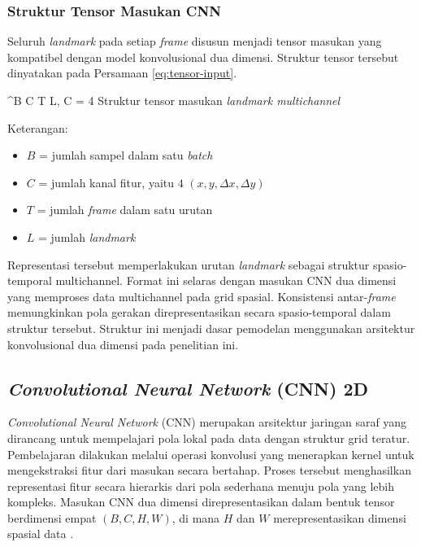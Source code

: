 \subsubsection{Struktur Tensor Masukan CNN}
\label{subsubsec:struktur-tensor}
Seluruh \textit{landmark} pada setiap \textit{frame} disusun menjadi tensor masukan yang kompatibel dengan model konvolusional dua dimensi.
Struktur tensor tersebut dinyatakan pada Persamaan \ref{eq:tensor-input}.

\begin{equationcaptioned}{
 \in {}^{B \times C \times T \times L}, \quad C = 4
}{
Struktur tensor masukan \textit{landmark multichannel}
}
\end{equationcaptioned}

Keterangan:
\begin{itemize}
  \renewcommand{\labelitemi}{}
  \item $B$ = jumlah sampel dalam satu \textit{batch}
  \item $C$ = jumlah kanal fitur, yaitu $4$ $(x, y, \Delta x, \Delta y)$
  \item $T$ = jumlah \textit{frame} dalam satu urutan
  \item $L$ = jumlah \textit{landmark}
\end{itemize}

Representasi tersebut memperlakukan urutan \textit{landmark} sebagai struktur spasio-temporal multichannel.
Format ini selaras dengan masukan CNN dua dimensi yang memproses data multichannel pada grid spasial.
Konsistensi antar-\textit{frame} memungkinkan pola gerakan direpresentasikan secara spasio-temporal dalam struktur tersebut.
Struktur ini menjadi dasar pemodelan menggunakan arsitektur konvolusional dua dimensi pada penelitian ini.

\subsection{\textit{Convolutional Neural Network} (CNN) 2D} \label{subsec:cnn2d}

\textit{Convolutional Neural Network} (CNN) merupakan arsitektur jaringan saraf yang dirancang untuk mempelajari pola lokal pada data dengan struktur grid teratur. 
Pembelajaran dilakukan melalui operasi konvolusi yang menerapkan kernel untuk mengekstraksi fitur dari masukan secara bertahap. 
Proses tersebut menghasilkan representasi fitur secara hierarkis dari pola sederhana menuju pola yang lebih kompleks. 
Masukan CNN dua dimensi direpresentasikan dalam bentuk tensor berdimensi empat $(B, C, H, W)$, di mana $H$ dan $W$ merepresentasikan dimensi spasial data \cite{lecun1998gradientbased,wu2017introductiontc}.

